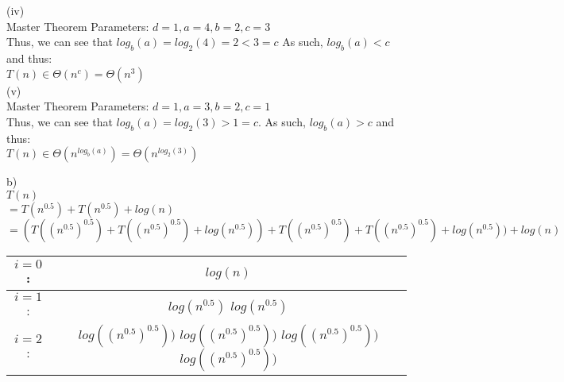 \documentclass[12pt,a4paper]{article}
\begin{document}
(iv) \\
Master Theorem Parameters: $ d = 1, a = 4, b = 2, c = 3$\\
Thus, we can see that $log_b (a) = log_2 (4) = 2 < 3 = c$ As such, $log_b (a) < c$ and thus: \\
$T(n) \in \Theta(n^c) = \Theta(n^3)$ \\

(v) \\
Master Theorem Parameters: $ d  = 1, a = 3, b = 2, c = 1$\\
Thus, we can see that $log_b (a) = log_2 (3) > 1 = c$. As such, $log_b (a) > c$ and thus: \\
$T(n) \in \Theta(n^{log_b (a)}) = \Theta(n^{log_2 (3)})$ \\

\vskip 10in



b)\\

$T(n)$ \\
$= T(n^{0.5}) + T(n^{0.5}) + log (n)$\\
$= (T( (n^{0.5})^{0.5} ) + T( (n^{0.5})^{0.5} ) + log (n^{0.5})) + T( (n^{0.5})^{0.5} ) + T( (n^{0.5})^{0.5} ) + log (n^{0.5})) + log (n)$\\

\begin{tabular}{|c | c|}
\hline
$i = 0$:  & $log(n)$ \\
\hline
$i = 1$: & $log(n^{0.5})$   $log(n^{0.5})$\\
\hline
$i = 2$:  & $log( (n^{0.5})^{0.5}) )$   $log((n^{0.5})^{0.5}))$ $log((n^{0.5})^{0.5}))$   $log((n^{0.5})^{0.5}))$ \\
\hline
\end{tabular}

\vskip 1in
\end{document}
